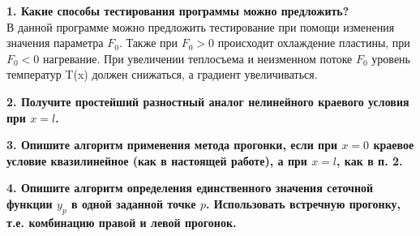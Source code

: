 \documentclass[a4paper,oneside,12pt]{extreport}
\begin{document}
\textbf{1. Какие способы тестирования программы можно предложить?}\\

В данной программе можно предложить тестирование при помощи изменения значения параметра 
$F_0$. Также при $F_0 > 0$ происходит охлаждение пластины, при $F_0 < 0$ нагревание. При увеличении теплосъема и неизменном потоке
$F_0$ уровень температур T(x) должен снижаться, а градиент увеличиваться.


\textbf{2. Получите  простейший разностный аналог нелинейного краевого условия при $x = l$.}\\

\begin{figure}[ht!]
\end{figure}


\textbf{3. Опишите алгоритм применения метода прогонки, если при $x = 0$ краевое условие квазилинейное (как в настоящей работе), а при $x = l$, как в п. 2.}\\

\begin{figure}[ht!]
\end{figure}

\textbf{4. Опишите алгоритм определения единственного значения сеточной функции $y_p$ в одной заданной точке $p$. Использовать встречную прогонку, т.е. комбинацию правой и левой прогонок.}\\
\end{document}
